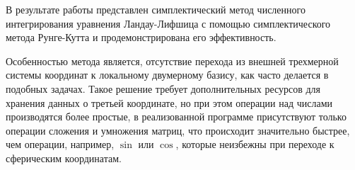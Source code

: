 
В результате работы представлен симплектический метод численного интегрирования
уравнения Ландау-Лифшица с помощью симплектического метода Рунге-Кутта и
продемонстрирована его эффективность.

Особенностью метода является, отсутствие перехода из внешней трехмерной системы
координат к локальному двумерному базису, как часто делается в подобных
задачах. Такое решение требует дополнительных ресурсов для хранения данных о
третьей координате, но при этом операции над числами производятся более
простые, в реализованной программе присутствуют только операции сложения и
умножения матриц, что происходит значительно быстрее, чем операции, например,
$\sin$ или $\cos$, которые неизбежны при переходе к сферическим координатам.
